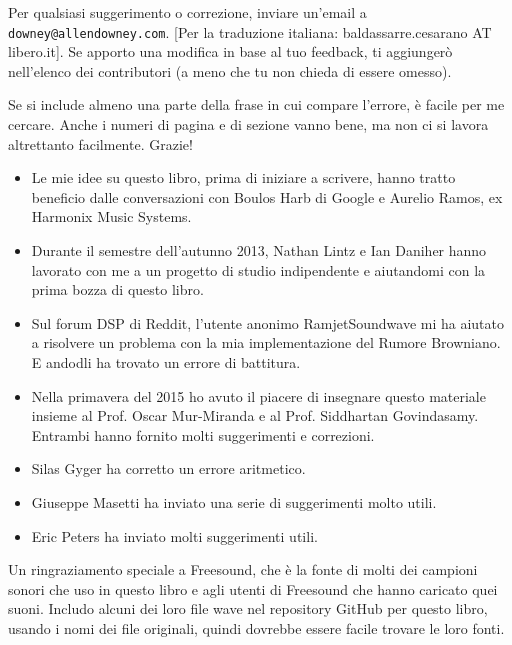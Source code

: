\documentclass[12pt,a4paper]{book}
\begin{document}
Per qualsiasi suggerimento o correzione, inviare un'email a {\tt downey@allendowney.com}.  [Per la traduzione italiana: baldassarre.cesarano AT libero.it]. Se apporto una modifica in base al tuo feedback, ti aggiungerò nell'elenco dei contributori (a meno che tu non chieda di essere omesso).  

Se si include almeno una parte della frase in cui compare l'errore, è facile per me cercare. Anche i numeri di pagina e di sezione vanno bene, ma non ci si lavora altrettanto facilmente. Grazie!

\small

\begin{itemize} 

\item Le mie idee su questo libro, prima di iniziare a scrivere, hanno tratto beneficio dalle conversazioni con Boulos Harb di Google e Aurelio Ramos, ex Harmonix Music Systems.

\item Durante il semestre dell'autunno 2013, Nathan Lintz e Ian Daniher hanno lavorato con me a un progetto di studio indipendente e aiutandomi con la prima bozza di questo libro.

\item Sul forum DSP di Reddit, l'utente anonimo RamjetSoundwave mi ha aiutato a risolvere un problema con la mia implementazione del Rumore Browniano. E andodli ha trovato un errore di battitura.

\item Nella primavera del 2015 ho avuto il piacere di insegnare questo materiale insieme al Prof. Oscar Mur-Miranda e al Prof. Siddhartan Govindasamy. Entrambi hanno fornito molti suggerimenti e correzioni.

\item Silas Gyger ha corretto un errore aritmetico.

\item Giuseppe Masetti ha inviato una serie di suggerimenti molto utili.

\item Eric Peters ha inviato molti suggerimenti utili.

\end{itemize} 

Un ringraziamento speciale a Freesound, che è la fonte di molti dei campioni sonori che uso in questo libro e agli utenti di Freesound che hanno caricato quei suoni. Includo alcuni dei loro file wave nel repository GitHub per questo libro, usando i nomi dei file originali, quindi dovrebbe essere facile trovare le loro fonti.
\end{document}
